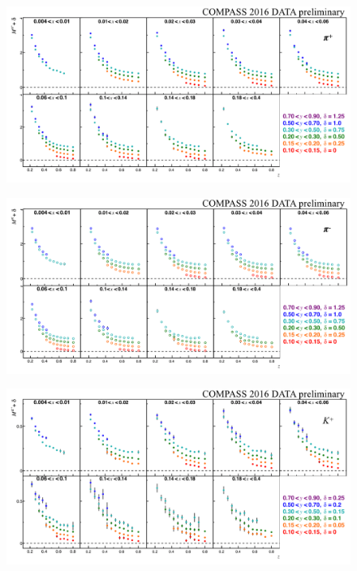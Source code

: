 \documentclass[letterpaper,12pt]{article}
\begin{document}
\begin{figure}
	\includegraphics[scale=0.5]{./gfx/Pip.png}
	\caption{}
	\label{Pip}
\end{figure}

\begin{figure}
	\includegraphics[scale=0.5]{./gfx/Pim.png}
	\caption{}
	\label{Pim}
\end{figure}

\begin{figure}
	\includegraphics[scale=0.5]{./gfx/Kp.png}
	\caption{}
	\label{Kp}
\end{figure}
\end{document}
